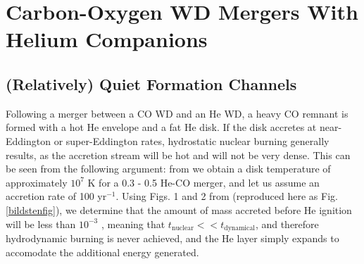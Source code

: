



\section{Carbon-Oxygen WD Mergers With Helium Companions}
\label{sec:withhecompanions}

\subsection{(Relatively) Quiet Formation Channels}

Following a merger between a CO WD and an He WD, a heavy CO remnant is formed with a hot He envelope and a fat He disk.  If the disk accretes at near-Eddington or super-Eddington rates, hydrostatic nuclear burning generally results, as the accretion stream will be hot and will not be very dense.  This can be seen from the following argument: from \cite{loreig09} we obtain a disk temperature of approximately $10^7$ K for a 0.3 - 0.5 {\Msun} He-CO merger, and let us assume an accretion rate of 100 {\Msun} yr$^{-1}$.  Using Figs. 1 and 2 from \cite{bild+07} (reproduced here as Fig. \ref{bildstenfig}), we determine that the amount of mass accreted before He ignition will be less than $10^{-3}$ {\Msun}, meaning that $t_{\mathrm{nuclear}} << t_{\mathrm{dynamical}}$, and therefore hydrodynamic burning is never achieved, and the He layer simply expands to accomodate the additional energy generated.

